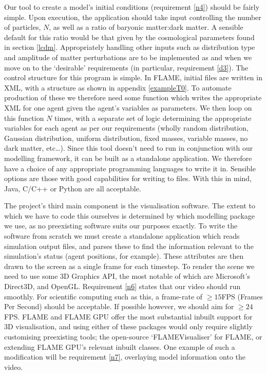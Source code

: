 \documentclass[11pt,a4paper]{article}
\begin{document}
Our tool to create a model's initial conditions (requirement \ref{n4}) should be fairly simple. Upon execution, the application should take input controlling the number of particles, $N$, as well as a ratio of baryonic matter:dark matter. A sensible default for this ratio would be that given by the cosmological parameters found in section \ref{lcdm}. Appropriately handling other inputs such as distribution type and amplitude of matter perturbations are to be implemented as and when we move on to the `desirable' requirements (in particular, requirement \ref{d3}).
The control structure for this program is simple. In FLAME, initial files are written in XML, with a structure as shown in appendix \ref{exampleT0}. To automate production of these we therefore need some function which writes the appropriate XML for one agent given the agent's variables as parameters. We then loop on this function $N$ times, with a separate set of logic determining the appropriate variables for each agent as per our requirements (wholly random distribution, Gaussian distribution, uniform distribution, fixed masses, variable masses, no dark matter, etc\ldots). Since this tool doesn't need to run in conjunction with our modelling framework, it can be built as a standalone application. We therefore have a choice of any appropriate programming languages to write it in. Sensible options are those with good capabilities for writing to files. With this in mind, Java, C/C++ or Python are all acceptable.

The project's third main component is the visualisation software. The extent to which we have to code this ourselves is determined by which modelling package we use, as no preexisting software suits our purposes exactly. To write the software from scratch we must create a standalone application which reads simulation output files, and parses these to find the information relevant to the simulation's status (agent positions, for example). These attributes are then drawn to the screen as a single frame for each timestep. To render the scene we need to use some 3D Graphics API, the most notable of which are Microsoft's Direct3D, and OpenGL. Requirement \ref{n6} states that our video should run smoothly. For scientific computing such as this, a frame-rate of $\geq 15$FPS (Frames Per Second) should be acceptable. If possible however, we should aim for $\geq 24$FPS.
FLAME and FLAME GPU offer the most substantial inbuilt support for 3D visualisation, and using either of these packages would only require slightly customising preexisting tools; the open-source `FLAMEVisualiser' for FLAME, or extending FLAME GPU's relevant inbuilt classes. One example of such a modification will be requirement \ref{n7}, overlaying model information onto the video.
\end{document}
